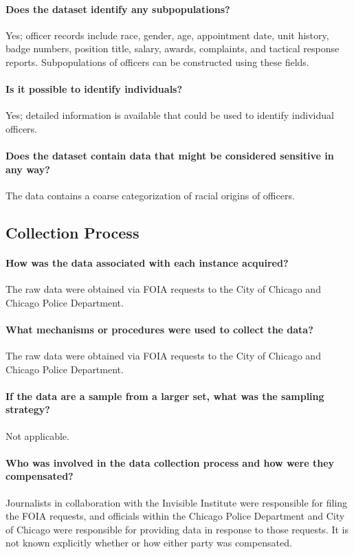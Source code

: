 \paragraph{Does the dataset identify any subpopulations?}
Yes; officer records include race, gender, age, appointment date, unit history, badge numbers, position title,
salary, awards, complaints, and tactical response reports. Subpopulations of officers can be constructed
using these fields.

\paragraph{Is it possible to identify individuals?}
Yes; detailed information is available that could be used to identify individual officers.

\paragraph{Does the dataset contain data that might be considered sensitive in any way?}
The data contains a coarse categorization of racial origins of officers.

\subsection{Collection Process}

\paragraph{How was the data associated with each instance acquired?}
The raw data were obtained via FOIA requests to the City of Chicago and Chicago Police Department.

\paragraph{What mechanisms or procedures were used to collect the data?}
The raw data were obtained via FOIA requests to the City of Chicago and Chicago Police Department.

\paragraph{If the data are a sample from a larger set, what was the sampling strategy?}
Not applicable. 

\paragraph{Who was involved in the data collection process and how were they compensated?}
Journalists in collaboration with the Invisible Institute were responsible for filing
the FOIA requests, and officials within the Chicago Police Department and City of Chicago were responsible
for providing data in response to those requests. It is not known explicitly whether or how 
either party was compensated.

